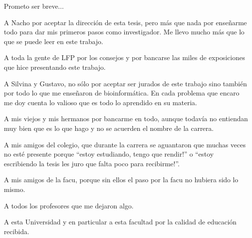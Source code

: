 Prometo ser breve...

A Nacho por aceptar la dirección de esta tesis, pero más que nada por enseñarme todo para dar mis primeros pasos como investigador. 
Me llevo mucho más que lo que se puede leer en este trabajo.

A toda la gente de LFP por los consejos y por bancarse las miles de exposiciones que hice presentando este trabajo.

A Silvina y Gustavo, no sólo por aceptar ser jurados de este trabajo sino también por todo lo que me enseñaron de bioinformática. 
En cada problema que encaro me doy cuenta lo valioso que es todo lo aprendido en su materia. 

A mis viejos y mis hermanos por bancarme en todo, aunque todavía no entiendan muy bien que es lo que hago y no se acuerden el nombre de la carrera.

A mis amigos del colegio, que durante la carrera se aguantaron que muchas veces no esté presente porque ``estoy estudiando, tengo que rendir!'' o ``estoy escribiendo la tesis les juro que falta poco para recibirme!''.

A mis amigos de la facu, porque sin ellos el paso por la facu no hubiera sido lo mismo.  

A todos los profesores que me dejaron algo.

A esta Universidad y en particular a esta facultad por la calidad de educación recibida.

